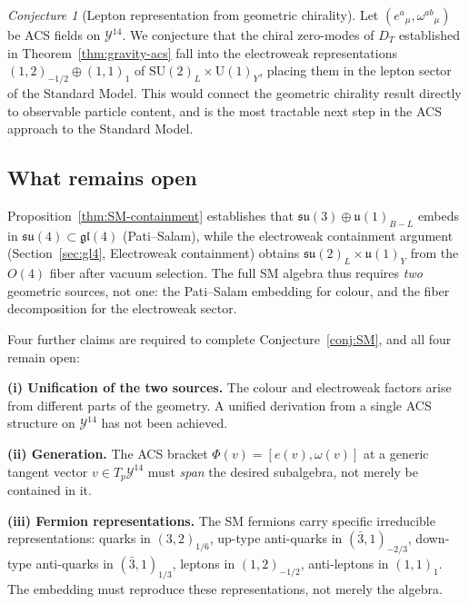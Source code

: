 \documentclass[12pt,a4paper]{article}
\theoremstyle{plain}
\theoremstyle{definition}
\theoremstyle{remark}
\newtheorem{conjecture}[theorem]{Conjecture}
\begin{document}
\begin{conjecture}[Lepton representation from geometric chirality]
\label{conj:lepton}
Let $(e^a{}_\mu, \omega^{ab}{}_\mu)$ be ACS fields on $\mathcal{Y}^{14}$.
We conjecture that the chiral zero-modes of $D_T$ established in
Theorem~\ref{thm:gravity-acs} fall into the electroweak representations
$(1,2)_{-1/2} \oplus (1,1)_1$ of $\mathrm{SU}(2)_L \times \mathrm{U}(1)_Y$,
placing them in the lepton sector of the Standard Model.
This would connect the geometric chirality result directly to
observable particle content, and is the most tractable next step
in the ACS approach to the Standard Model.
\end{conjecture}

\subsection{What remains open}

Proposition~\ref{thm:SM-containment} establishes that $\mathfrak{su}(3) \oplus \mathfrak{u}(1)_{B-L}$
embeds in $\mathfrak{su}(4) \subset \mathfrak{gl}(4)$ (Pati--Salam), while the electroweak 
containment argument (Section~\ref{sec:gl4}, Electroweak containment) obtains 
$\mathfrak{su}(2)_L \times \mathfrak{u}(1)_Y$ from the $O(4)$ fiber after vacuum selection.
The full SM algebra thus requires \emph{two} geometric sources, not one:
the Pati--Salam embedding for colour, and the fiber decomposition for the electroweak sector.

Four further claims are required to complete
Conjecture~\ref{conj:SM}, and all four remain open:

\medskip
\noindent\textbf{(i) Unification of the two sources.}
The colour and electroweak factors arise from different parts of the geometry.
A unified derivation from a single ACS structure on $\mathcal{Y}^{14}$ has not been achieved.

\medskip
\noindent\textbf{(ii) Generation.}  
The ACS bracket $\Phi(v) = [e(v), \omega(v)]$ at a generic tangent vector 
$v \in T_p\mathcal{Y}^{14}$ must \emph{span} the desired subalgebra, 
not merely be contained in it.

\medskip
\noindent\textbf{(iii) Fermion representations.}  
The SM fermions carry specific irreducible representations: 
quarks in $(3, 2)_{1/6}$, up-type anti-quarks in $(\bar{3},1)_{-2/3}$, 
down-type anti-quarks in $(\bar{3},1)_{1/3}$, leptons in $(1,2)_{-1/2}$, 
anti-leptons in $(1,1)_1$.  The embedding must reproduce these 
representations, not merely the algebra.
\end{document}
